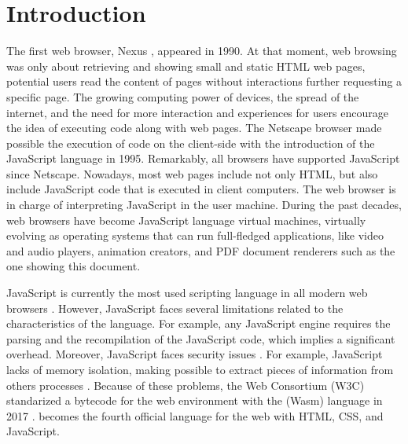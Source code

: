 \chapter{Introduction}
\label{chapter:intro}


The first web browser, Nexus \cite{nexus}, appeared in 1990.
At that moment, web browsing was only about retrieving and showing small and static HTML web pages, \ie potential users read the content of pages without interactions further requesting a specific page.
The growing computing power of devices, the spread of the internet, and the need for more interaction and experiences for users encourage the idea of executing code along with web pages.
The Netscape browser made possible the execution of code on the client-side with the introduction of the JavaScript \cite{10.1007/978-3-642-14107-2_7} language in 1995.
Remarkably, all browsers have supported JavaScript since Netscape. 
Nowadays, most web pages include not only HTML, but also include JavaScript code that is executed in client computers.
The web browser is in charge of interpreting JavaScript in the user machine.
During the past decades, web browsers have become JavaScript language virtual machines, virtually evolving as operating systems that can run full-fledged applications, like video and audio players, animation creators, and PDF document renderers such as the one showing this document.



JavaScript is currently the most used scripting language in all modern web browsers \cite{mulazzani2013fast}. 
However, JavaScript faces several limitations related to the characteristics of the language. For example, any JavaScript engine requires the parsing and the recompilation of the JavaScript code, which implies a significant overhead.
Moreover, JavaScript faces security issues \cite{10.1145/1190216.1190252}.
For example, JavaScript lacks of memory isolation, making possible to extract pieces of information from others processes \cite{10.1145/3412841.3442001}.
Because of these problems, the Web Consortium (W3C) standarized a bytecode for the web environment with the \wasm (Wasm) language in 2017 \cite{Haas_2017}. 
\wasm becomes the fourth official language for the web with HTML, CSS, and JavaScript.


